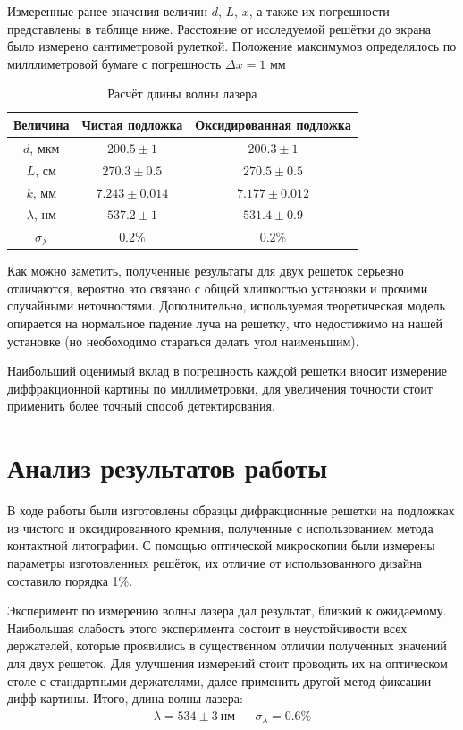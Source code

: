 \documentclass[a4paper,12pt]{article}
\begin{document}
Измеренные ранее значения величин $d$, $L$, $x$, а также их погрешности представлены в таблице ниже. Расстояние от исследуемой решётки до экрана было измерено сантиметровой рулеткой. Положение максимумов определялось по милллиметровой бумаге с погрешность $\Delta x =1$ мм
\begin{table}[H]
\centering
\caption{Расчёт длины волны лазера}
\begin{tabular}{ccc}
\toprule
Величина & Чистая подложка & Оксидированная подложка \\
\midrule
$d$, мкм & $200.5 \pm 1$ & $200.3 \pm 1$ \\
$L$, см & $270.3 \pm 0.5$ & $270.5 \pm 0.5$ \\
$k$, мм & $7.243 \pm 0.014$ & $7.177 \pm 0.012$ \\
$\lambda$, нм & $537.2 \pm 1$ & $531.4 \pm 0.9$ \\
$\sigma_\lambda$ & 0.2\% & 0.2\% \\
\bottomrule
\end{tabular}
\end{table}

Как можно заметить, полученные результаты для двух решеток серьезно отличаются, вероятно это связано с общей хлипкостью установки и прочими случайными неточностями. Дополнительно, используемая теоретическая модель опирается на нормальное падение луча на решетку, что недостижимо на нашей установке (но необоходимо стараться делать угол наименьшим).

Наибольший оценимый вклад в погрешность каждой решетки вносит измерение диффракционной картины по миллиметровки, для увеличения точности стоит применить более точный способ детектирования. 


\section*{Анализ результатов работы}
В ходе работы были изготовлены образцы дифракционные решетки на подложках из чистого и оксидированного кремния, полученные с использованием метода контактной литографии. С помощью оптической микроскопии были измерены параметры изготовленных решёток, их отличие от использованного дизайна составило порядка 1\%.

Эксперимент по измерению волны лазера дал результат, близкий к ожидаемому. Наибольшая слабость этого эксперимента состоит в неустойчивости всех держателей, которые проявились в существенном отличии полученных значений для двух решеток. Для улучшения измерений стоит проводить их на оптическом столе с стандартными держателями, далее применить другой метод фиксации дифф картины. Итого, длина волны лазера:
\begin{align*}
	\lambda=534\pm3 ~\text{нм} && \sigma_\lambda=0.6 \%
\end{align*}
\end{document}
